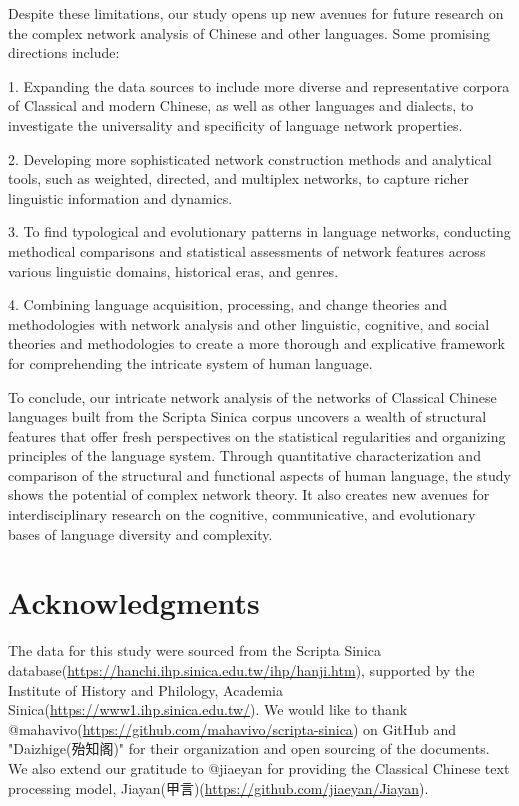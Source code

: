 \documentclass[11pt]{article}
\begin{document}
Despite these limitations, our study opens up new avenues for future research on the complex network analysis of Chinese and other languages. Some promising directions include:

1. Expanding the data sources to include more diverse and representative corpora of Classical and modern Chinese, as well as other languages and dialects, to investigate the universality and specificity of language network properties.

2. Developing more sophisticated network construction methods and analytical tools, such as weighted, directed, and multiplex networks, to capture richer linguistic information and dynamics.

3. To find typological and evolutionary patterns in language networks, conducting methodical comparisons and statistical assessments of network features across various linguistic domains, historical eras, and genres.

4. Combining language acquisition, processing, and change theories and methodologies with network analysis and other linguistic, cognitive, and social theories and methodologies to create a more thorough and explicative framework for comprehending the intricate system of human language.


To conclude, our intricate network analysis of the networks of Classical Chinese languages built from the Scripta Sinica corpus uncovers a wealth of structural features that offer fresh perspectives on the statistical regularities and organizing principles of the language system. Through quantitative characterization and comparison of the structural and functional aspects of human language, the study shows the potential of complex network theory. It also creates new avenues for interdisciplinary research on the cognitive, communicative, and evolutionary bases of language diversity and complexity.
\section*{Acknowledgments}
The data for this study were sourced from the Scripta Sinica database(\url{https://hanchi.ihp.sinica.edu.tw/ihp/hanji.htm}), supported by the Institute of History and Philology, Academia Sinica(\url{https://www1.ihp.sinica.edu.tw/}). We would like to thank @mahavivo(\url{https://github.com/mahavivo/scripta-sinica}) on GitHub and "Daizhige(殆知阁)" for their organization and open sourcing of the documents. We also extend our gratitude to @jiaeyan for providing the Classical Chinese text processing model, Jiayan(甲言)(\url{https://github.com/jiaeyan/Jiayan}).
\end{document}
